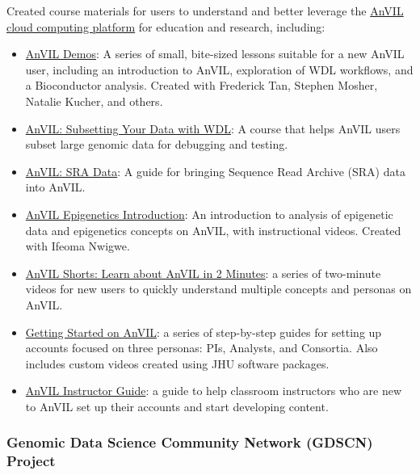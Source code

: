 \documentclass{cv}
\begin{document}
Created course materials for users to understand and better leverage the \href{https://anvilproject.org/}{AnVIL cloud computing platform} for education and research, including: 

\begin{itemize}

\item \href{https://hutchdatascience.org/AnVIL_Demos/}{AnVIL Demos}: A series of small, bite-sized lessons suitable for a new AnVIL user, including an introduction to AnVIL, exploration of WDL workflows, and a Bioconductor analysis. Created with Frederick Tan, Stephen Mosher, Natalie Kucher, and others.

\item \href{https://hutchdatascience.org/AnVIL_Data_Subsetting}{AnVIL: Subsetting Your Data with WDL}: A course that helps AnVIL users subset large genomic data for debugging and testing.

\item \href{https://hutchdatascience.org/AnVIL_SRA_Data/}{AnVIL: SRA Data}: A guide for bringing Sequence Read Archive (SRA) data into AnVIL.

\item \href{https://hutchdatascience.org/AnVIL_Book_Epigenetics_Intro/}{AnVIL Epigenetics Introduction}: An introduction to analysis of epigenetic data and epigenetics concepts on AnVIL, with instructional videos. Created with Ifeoma Nwigwe.

\item \href{https://www.youtube.com/watch?v=tVh93e6TzCE\&list=PL6aYJ_0zJ4uCABkMngSYjPo_3c-nUUmio}{AnVIL Shorts: Learn about AnVIL in 2 Minutes}: a series of two-minute videos for new users to quickly understand multiple concepts and personas on AnVIL.

\item \href{https://jhudatascience.org/AnVIL_Book_Getting_Started/}{Getting Started on AnVIL}: a series of step-by-step guides for setting up accounts focused on three personas: PIs, Analysts, and Consortia. Also includes custom videos created using JHU software packages.

\item \href{https://jhudatascience.org/AnVIL_Book_Instructor_Guide/}{AnVIL Instructor Guide}: a guide to help classroom instructors who are new to AnVIL set up their accounts and start developing content.

\end{itemize}

\subsubsection*{Genomic Data Science Community Network (GDSCN) Project}
\end{document}
